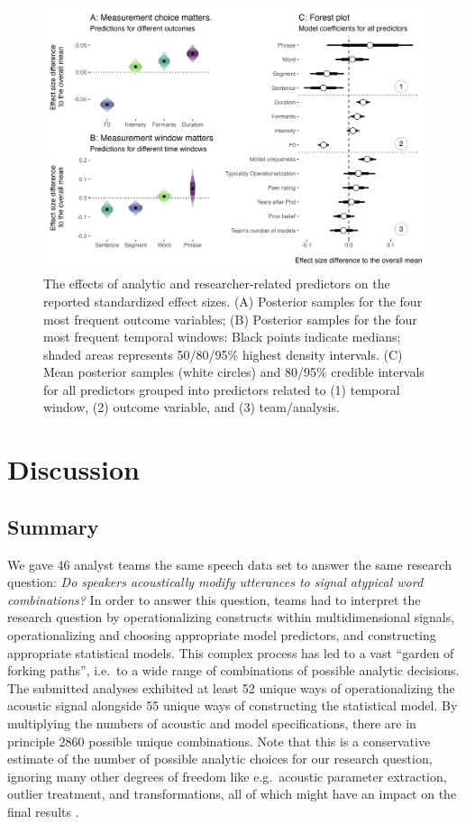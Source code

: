 \documentclass[Review,times,sageh]{sagej}
\begin{document}
\begin{figure}
\includegraphics[width=1\linewidth]{../figs/alltogether} \caption{The effects of analytic and researcher-related predictors on the reported standardized effect sizes. (A) Posterior samples for the four most frequent outcome variables; (B) Posterior samples for the four most frequent temporal windows: Black points indicate medians; shaded areas represents 50/80/95\% highest density intervals. (C) Mean posterior samples (white circles) and 80/95\% credible intervals for all predictors grouped into predictors related to (1) temporal window, (2) outcome variable, and (3) team/analysis.}\label{fig:plot-meta2}
\end{figure}

\hypertarget{discussion}{%
\section{Discussion}\label{discussion}}

\hypertarget{summary}{%
\subsection{Summary}\label{summary}}

We gave 46 analyst teams the same speech data set to answer the same research question: \emph{Do
speakers acoustically modify utterances to signal atypical word combinations?}
In order to answer this question, teams had to interpret the research question by
operationalizing constructs within multidimensional signals, operationalizing and choosing appropriate model predictors, and constructing appropriate statistical models.
This complex process has led to a vast ``garden of forking paths'', i.e.~to a wide range of combinations of possible analytic decisions.
The submitted analyses exhibited at least 52 unique ways of operationalizing the acoustic signal alongside 55 unique ways of constructing the statistical model.
By multiplying the numbers of acoustic and model specifications, there are in principle 2860 possible unique combinations.
Note that this is a conservative estimate of the number of possible analytic choices for our research question, ignoring many other degrees of freedom like e.g.~acoustic parameter extraction, outlier treatment, and transformations, all of which might have an impact on the final results \citep{breznau2021observing}.
\end{document}
